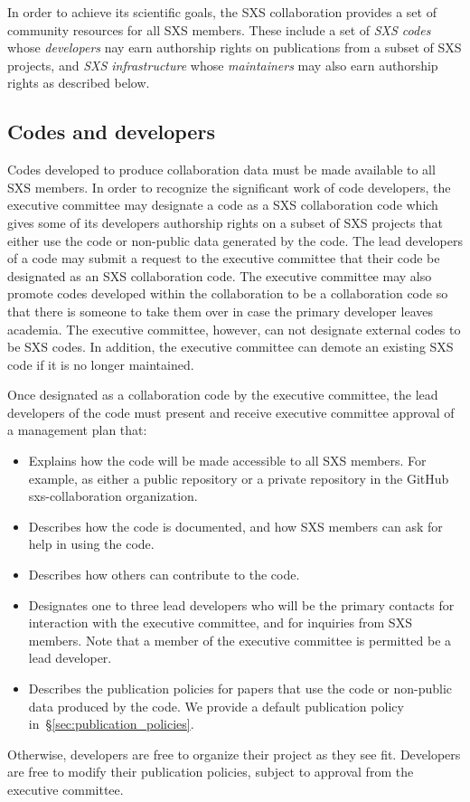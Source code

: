 \documentclass[12pt]{article}
\begin{document}
In order to achieve its scientific goals, the SXS collaboration
provides a set of community resources for all SXS members.  These
include a set of \emph{SXS codes} whose \emph{developers} nay earn
authorship rights on publications from a subset of SXS projects, and
\emph{SXS infrastructure} whose \emph{maintainers} may also earn
authorship rights as described below.

\subsection{Codes and developers}\label{sec:codes}

Codes developed to produce collaboration data must be made available
to all SXS members.  In order to recognize the significant work of
code developers, the executive committee may designate a code as a SXS
collaboration code which gives some of its developers authorship
rights on a subset of SXS projects that either use the code or
non-public data generated by the code. The lead developers of a code
may submit a request to the executive committee that their code be
designated as an SXS collaboration code.  The executive committee may
also promote codes developed within the collaboration to be a
collaboration code so that there is someone to take them over in case
the primary developer leaves academia.  The executive committee,
however, can not designate external codes to be SXS codes.  In
addition, the executive committee can demote an existing SXS code if
it is no longer maintained.

Once designated as a collaboration code by the executive committee,
the lead developers of the code must present and receive executive
committee approval of a management plan that:
\begin{itemize}
\setlength\itemsep{-0.25em}
\item Explains how the code will be made accessible to all SXS
  members.  For example, as either a public repository or a private
  repository in the GitHub sxs-collaboration organization.
\item Describes how the code is documented, and how SXS members can
  ask for help in using the code.
\item Describes how others can contribute to the code.
\item Designates one to three lead developers who will be the primary
  contacts for interaction with the executive committee, and for
  inquiries from SXS members.  Note that a member of the executive
  committee is permitted be a lead developer.
\item Describes the publication policies for papers that use the code
  or non-public data produced by the code.  We provide a default
  publication policy in~\S\ref{sec:publication_policies}.
\end{itemize}
Otherwise, developers are free to organize their project as they see
fit.  Developers are free to modify their publication policies,
subject to approval from the executive committee.
\end{document}
